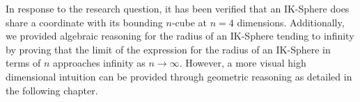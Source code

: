 \pagebreak
In response to the research question, it has been verified that an IK-Sphere does share a coordinate with its bounding $n$-cube at $n=4$ dimensions. Additionally, we provided algebraic reasoning for the radius of an IK-Sphere tending to infinity by proving that the limit of the expression for the radius of an IK-Sphere in terms of $n$ approaches infinity as $n \to \infty$. However, a more visual high dimensional intuition can be provided through geometric reasoning as detailed in the following chapter.

    

